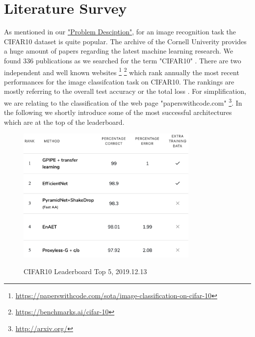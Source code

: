 \documentclass[journal]{IEEEtran}
\begin{document}
\section{Literature Survey}
\noindent As mentioned in our \hyperref[sec:problemDescription]{"Problem Desciption"}, for an image recognition task the CIFAR10 dataset is quite popular. The archive of the Cornell Univerity provides a huge amount of papers regarding the latest machine learning research. We found 336 publications as we searched for the term "CIFAR10" . There are two independent and well known websites \footnote{\href{https://paperswithcode.com/sota/image-classification-on-cifar-10}{https://paperswithcode.com/sota/image-classification-on-cifar-10}} \footnote{\href{https://benchmarks.ai/cifar-10}{https://benchmarks.ai/cifar-10}} which rank annually the most recent performances for the image classifcation task on CIFAR10. The rankings are mostly referring to the overall test accuracy or the total loss \cite{echersly}. For simplification, we are relating to the classification of the web page "paperswithcode.com" \footnote{\href{http://arxiv.org/}{http://arxiv.org/}}. In the following we shortly introduce some of the most successful architectures which are at the top of the leaderboard. \\

\begin{figure}
  \begin{center}
  \includegraphics[width=3.5in]{photo/related_work.png}\\
  \caption{CIFAR10 Leaderboard Top 5, 2019.12.13}\label{leaderboard}
  \end{center}
\end{figure}
\end{document}

